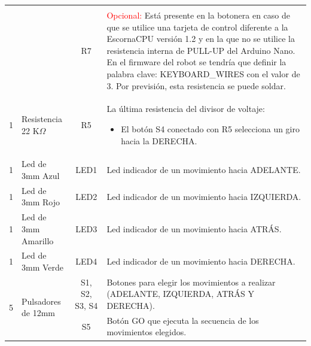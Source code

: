 \documentclass{article}
\begin{document}
\begin{longtable}{|c|l|c|m{}|}
\begin{itemize}
        \end{itemize} \\ \cline{3-4}
        &  & R7 & \textcolor{red}{Opcional:} Está presente en la botonera en caso de que se utilice una tarjeta de control diferente a la EscornaCPU versión 1.2 y en la que no se utilice la resistencia interna de PULL-UP del Arduino Nano. En el firmware del robot se tendría que definir la palabra clave: KEYBOARD\_WIRES con el valor de 3. Por previsión, esta resistencia se puede soldar. \\ \hline
        1 & Resistencia 22 K$\Omega$ & R5 & La última resistencia  del divisor de voltaje: 
        \begin{itemize}
            \item El botón S4 conectado con R5 selecciona un giro hacia la DERECHA.
        \end{itemize}\\ \hline
        1 & Led de 3mm Azul & LED1 & Led indicador de un movimiento hacia ADELANTE. \\ \hline
        1 & Led de 3mm Rojo & LED2 & Led indicador de un movimiento hacia IZQUIERDA. \\ \hline
        1 & Led de 3mm Amarillo & LED3 & Led indicador de un movimiento hacia ATRÁS. \\ \hline
        1 & Led de 3mm Verde & LED4 & Led indicador de un movimiento hacia DERECHA. \\ \hline
        \multirow{2}{*}{5}
        & \multirow{2}{*}{Pulsadores de 12mm} & S1, S2, S3, S4 & Botones para elegir los movimientos a realizar (ADELANTE, IZQUIERDA, ATRÁS Y DERECHA).\\ \cline{3-4}
        & & S5 & Botón GO que ejecuta la secuencia de los movimientos elegidos.\\ \hline 
\end{longtable}
\end{document}
